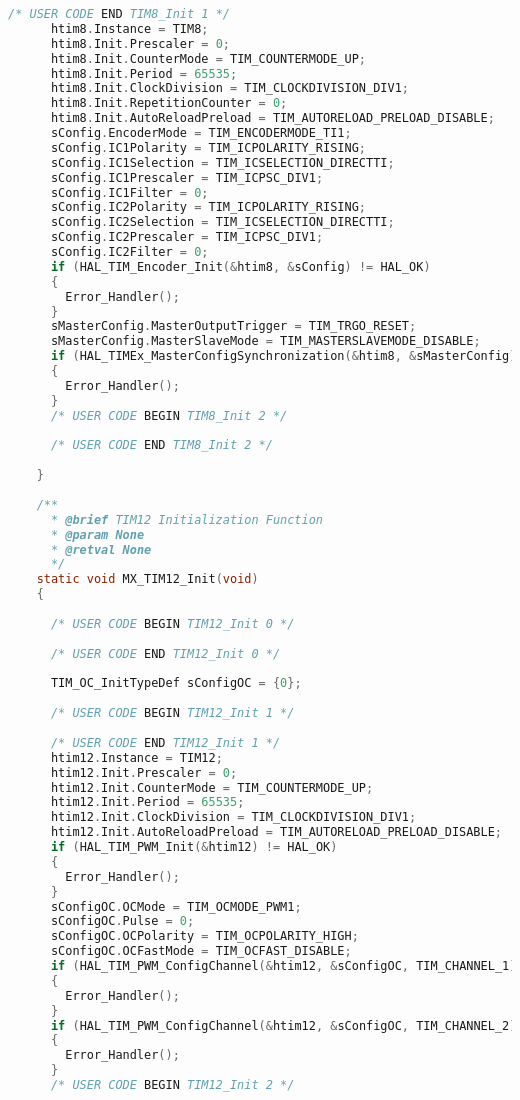 \begin{lstlisting}[language=C, caption=メインコード(main.c)]
      /* USER CODE END TIM8_Init 1 */
      htim8.Instance = TIM8;
      htim8.Init.Prescaler = 0;
      htim8.Init.CounterMode = TIM_COUNTERMODE_UP;
      htim8.Init.Period = 65535;
      htim8.Init.ClockDivision = TIM_CLOCKDIVISION_DIV1;
      htim8.Init.RepetitionCounter = 0;
      htim8.Init.AutoReloadPreload = TIM_AUTORELOAD_PRELOAD_DISABLE;
      sConfig.EncoderMode = TIM_ENCODERMODE_TI1;
      sConfig.IC1Polarity = TIM_ICPOLARITY_RISING;
      sConfig.IC1Selection = TIM_ICSELECTION_DIRECTTI;
      sConfig.IC1Prescaler = TIM_ICPSC_DIV1;
      sConfig.IC1Filter = 0;
      sConfig.IC2Polarity = TIM_ICPOLARITY_RISING;
      sConfig.IC2Selection = TIM_ICSELECTION_DIRECTTI;
      sConfig.IC2Prescaler = TIM_ICPSC_DIV1;
      sConfig.IC2Filter = 0;
      if (HAL_TIM_Encoder_Init(&htim8, &sConfig) != HAL_OK)
      {
        Error_Handler();
      }
      sMasterConfig.MasterOutputTrigger = TIM_TRGO_RESET;
      sMasterConfig.MasterSlaveMode = TIM_MASTERSLAVEMODE_DISABLE;
      if (HAL_TIMEx_MasterConfigSynchronization(&htim8, &sMasterConfig) != HAL_OK)
      {
        Error_Handler();
      }
      /* USER CODE BEGIN TIM8_Init 2 */
    
      /* USER CODE END TIM8_Init 2 */
    
    }
    
    /**
      * @brief TIM12 Initialization Function
      * @param None
      * @retval None
      */
    static void MX_TIM12_Init(void)
    {
    
      /* USER CODE BEGIN TIM12_Init 0 */
    
      /* USER CODE END TIM12_Init 0 */
    
      TIM_OC_InitTypeDef sConfigOC = {0};
    
      /* USER CODE BEGIN TIM12_Init 1 */
    
      /* USER CODE END TIM12_Init 1 */
      htim12.Instance = TIM12;
      htim12.Init.Prescaler = 0;
      htim12.Init.CounterMode = TIM_COUNTERMODE_UP;
      htim12.Init.Period = 65535;
      htim12.Init.ClockDivision = TIM_CLOCKDIVISION_DIV1;
      htim12.Init.AutoReloadPreload = TIM_AUTORELOAD_PRELOAD_DISABLE;
      if (HAL_TIM_PWM_Init(&htim12) != HAL_OK)
      {
        Error_Handler();
      }
      sConfigOC.OCMode = TIM_OCMODE_PWM1;
      sConfigOC.Pulse = 0;
      sConfigOC.OCPolarity = TIM_OCPOLARITY_HIGH;
      sConfigOC.OCFastMode = TIM_OCFAST_DISABLE;
      if (HAL_TIM_PWM_ConfigChannel(&htim12, &sConfigOC, TIM_CHANNEL_1) != HAL_OK)
      {
        Error_Handler();
      }
      if (HAL_TIM_PWM_ConfigChannel(&htim12, &sConfigOC, TIM_CHANNEL_2) != HAL_OK)
      {
        Error_Handler();
      }
      /* USER CODE BEGIN TIM12_Init 2 */
    

\end{lstlisting}

